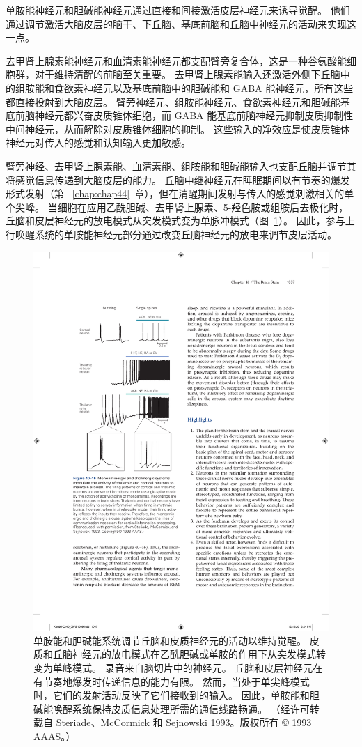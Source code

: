 单胺能神经元和胆碱能神经元通过直接和间接激活皮层神经元来诱导觉醒。
他们通过调节激活大脑皮层的脑干、下丘脑、基底前脑和丘脑中神经元的活动来实现这一点。


去甲肾上腺素能神经元和血清素能神经元都支配臂旁复合体，这是一种谷氨酸能细胞群，对于维持清醒的前脑至关重要。
去甲肾上腺素能输入还激活外侧下丘脑中的组胺能和食欲素神经元以及基底前脑中的胆碱能和 GABA 能神经元，所有这些都直接投射到大脑皮层。
臂旁神经元、组胺能神经元、食欲素神经元和胆碱能基底前脑神经元都兴奋皮质锥体细胞，而 GABA 能基底前脑神经元抑制皮质抑制性中间神经元，从而解除对皮质锥体细胞的抑制。
这些输入的净效应是使皮质锥体神经元对传入的感觉和认知输入更加敏感。


臂旁神经、去甲肾上腺素能、血清素能、组胺能和胆碱能输入也支配丘脑并调节其将感觉信息传递到大脑皮层的能力。
丘脑中继神经元在睡眠期间以有节奏的爆发形式发射（第 ~\ref{chap:chap44}~章），但在清醒期间发射与传入的感觉刺激相关的单个尖峰。
当细胞在应用乙酰胆碱、去甲肾上腺素、5-羟色胺或组胺后去极化时，丘脑和皮层神经元的放电模式从突发模式变为单脉冲模式（图~\ref{fig:40_16}）。
因此，参与上行唤醒系统的单胺能神经元部分通过改变丘脑神经元的放电来调节皮层活动。


\begin{figure}[htbp]
	\centering
	\includegraphics[width=0.45\linewidth]{chap40/fig_40_16}
	\caption{单胺能和胆碱能系统调节丘脑和皮质神经元的活动以维持觉醒。 皮质和丘脑神经元的放电模式在乙酰胆碱或单胺的作用下从突发模式转变为单峰模式。 录音来自脑切片中的神经元。 丘脑和皮层神经元在有节奏地爆发时传递信息的能力有限。 然而，当处于单尖峰模式时，它们的发射活动反映了它们接收到的输入。 因此，单胺能和胆碱能唤醒系统保持皮质信息处理所需的通信线路畅通。 （经许可转载自 Steriade、McCormick 和 Sejnowski 1993。版权所有 © 1993 AAAS。）}
	\label{fig:40_16}
\end{figure}


